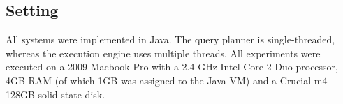 








\subsection{Setting}
All systems were implemented in Java. The query planner is
single-threaded, whereas the execution engine uses multiple
threads. All experiments were executed on a 2009 Macbook Pro with a
2.4 GHz Intel Core 2 Duo processor, 4GB RAM (of which 1GB was assigned
to the Java VM) and a Crucial m4 128GB solid-state disk.


